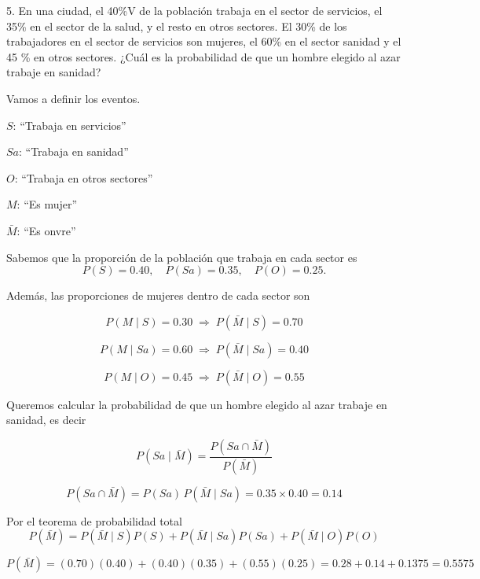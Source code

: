 \vspace{0.8cm}

5. En una ciudad, el 40\%V de la población trabaja en el sector de servicios, 
el 35\% en el sector de la salud, y el resto en otros sectores. 
El 30\% de los trabajadores en el sector de servicios son mujeres, el 60\% 
en el sector sanidad y el 45 \% en otros sectores. ¿Cuál es la probabilidad 
de que un hombre elegido al azar trabaje en sanidad? 

\vspace{0.5cm}

Vamos a definir los eventos.

$S$: ``Trabaja en servicios''

$Sa$: ``Trabaja en sanidad''

$O$: ``Trabaja en otros sectores''

$M$: ``Es mujer''

$\bar{M}$: ``Es onvre''

\vspace{0.4cm}

Sabemos que la proporción de la población que trabaja en cada sector es
$$P(S)=0.40,\quad P(Sa)=0.35,\quad P(O)=0.25.$$

\vspace{0.2cm}

Además, las proporciones de mujeres dentro de cada sector son

$$P(M\mid S)=0.30\;\Rightarrow\;P(\bar{M}\mid S)=0.70$$

$$P(M\mid Sa)=0.60\;\Rightarrow\;P(\bar{M}\mid Sa)=0.40$$

$$P(M\mid O)=0.45\;\Rightarrow\;P(\bar{M}\mid O)=0.55$$

\vspace{0.2cm}

Queremos calcular la probabilidad de que un hombre elegido al azar trabaje en sanidad, es decir

$$P(Sa\mid \bar{M})=\frac{P(Sa\cap\bar{M})}{P(\bar{M})}$$

$$P(Sa\cap\bar{M})=P(Sa)\,P(\bar{M}\mid Sa)=0.35\times 0.40=0.14$$

\vspace{0.2cm}

Por el teorema de probabilidad total
$$P(\bar{M})=P(\bar{M}\mid S)P(S)+P(\bar{M}\mid Sa)P(Sa)+P(\bar{M}\mid O)P(O)$$

$$P(\bar{M})=(0.70)(0.40)+(0.40)(0.35)+(0.55)(0.25)=0.28+0.14+0.1375=0.5575$$

\vspace{0.2cm}

